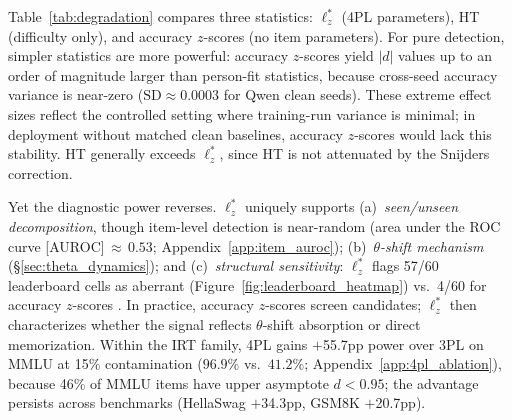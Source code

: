 Table~\ref{tab:degradation} compares three statistics: $\ell_z^*$ (4PL parameters), HT (difficulty only), and accuracy $z$-scores (no item parameters).
For pure detection, simpler statistics are more powerful: accuracy $z$-scores yield $|d|$ values up to an order of magnitude larger than person-fit statistics, because cross-seed accuracy variance is near-zero ($\text{SD}{\approx}0.0003$ for Qwen clean seeds).
These extreme effect sizes reflect the controlled setting where training-run variance is minimal; in deployment without matched clean baselines, accuracy $z$-scores would lack this stability.
HT generally exceeds $\ell_z^*$, since HT is not attenuated by the Snijders correction.

Yet the diagnostic power reverses.
$\ell_z^*$ uniquely supports (a)~\emph{seen/unseen decomposition}, though item-level detection is near-random (area under the ROC curve [AUROC]\,${\approx}\,0.53$; Appendix~\ref{app:item_auroc}); (b)~\emph{$\theta$-shift mechanism} (\S\ref{sec:theta_dynamics}); and (c)~\emph{structural sensitivity}: $\ell_z^*$ flags 57/60 leaderboard cells as aberrant (Figure~\ref{fig:leaderboard_heatmap}) vs.\ 4/60 for accuracy $z$-scores \citep{stonge2011}.
In practice, accuracy $z$-scores screen candidates; $\ell_z^*$ then characterizes whether the signal reflects $\theta$-shift absorption or direct memorization.
Within the IRT family, 4PL gains $+$55.7pp power over 3PL on MMLU at 15\% contamination ($96.9\%$ vs.\ $41.2\%$; Appendix~\ref{app:4pl_ablation}), because 46\% of MMLU items have upper asymptote $d < 0.95$; the advantage persists across benchmarks (HellaSwag $+$34.3pp, GSM8K $+$20.7pp).

